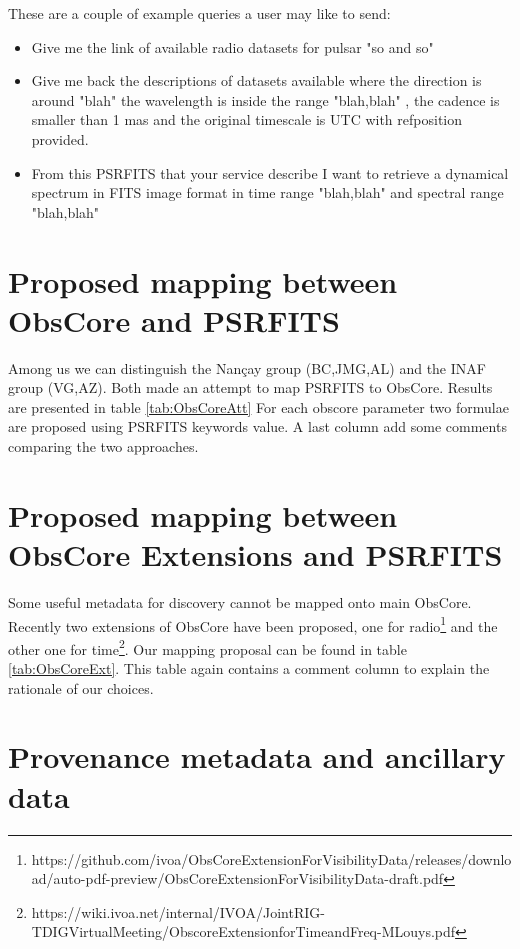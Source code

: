 \documentclass[11pt,a4paper]{ivoa}
\begin{document}
These are  a couple of example queries a user may like to send: 

 \begin{itemize}
        \item  Give me the  link of available radio datasets for pulsar "so and so" 
        \item   Give me back the descriptions of datasets available where the direction is around "blah" the wavelength is inside the range "blah,blah" , the cadence is smaller than 1 mas and the original timescale is UTC with refposition provided.
        \item  From this PSRFITS that your service describe I want to retrieve a dynamical spectrum in FITS image format in time range "blah,blah"  and spectral range "blah,blah"  
 \end{itemize} 
             
             
\section{Proposed mapping between ObsCore and PSRFITS}

Among us we can distinguish the Nan\c cay group (BC,JMG,AL) and the INAF group (VG,AZ). Both made an attempt to map PSRFITS to ObsCore. Results are presented in table \ref{tab:ObsCoreAtt}
For each obscore parameter two formulae are proposed using PSRFITS keywords value. A last column add some comments comparing the two approaches.

\section{Proposed mapping between ObsCore Extensions and PSRFITS}

Some useful metadata for discovery cannot be mapped onto main ObsCore. Recently two extensions of ObsCore have been proposed, one for radio\footnote{https://github.com/ivoa/ObsCoreExtensionForVisibilityData/releases/download/auto-pdf-preview/ObsCoreExtensionForVisibilityData-draft.pdf} and the other one for 
 time\footnote{https://wiki.ivoa.net/internal/IVOA/JointRIG-TDIGVirtualMeeting/ObscoreExtensionforTimeandFreq-MLouys.pdf}. Our mapping proposal can be found in table \ref{tab:ObsCoreExt}. This table again contains a comment column to explain the rationale of our choices.
 
 \section{Provenance metadata and ancillary data}
 
\end{document}
